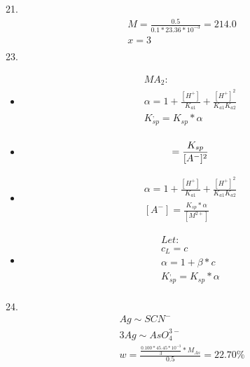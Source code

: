 \documentclass{article}
\begin{document}
21.\begin{equation}
    \begin{multlined}
        M = \frac{0.5}{0.1*23.36*10^{-3}} = 214.0\\
        x = 3\\
    \end{multlined}
\end{equation}
23.\begin{itemize}
    \item 
    \begin{equation}
        \begin{multlined}
            MA_2:\\
            \alpha = 1 + \frac{[H^+]}{K_{a1}} + \frac{[H^+]^2}{K_{a1}K_{a2}}\\
            K^,_{sp} = K_{sp}*\alpha\\
        \end{multlined}
    \end{equation}
    \item
    \begin{equation}
        [M^{2+}] = \frac{K_{sp}}{[A^-]^2}\\
    \end{equation}
    \item
    \begin{equation}
        \begin{multlined}
            \alpha = 1 + \frac{[H^+]}{K_{a1}} + \frac{[H^+]^2}{K_{a1}K_{a2}}\\
            [A^-] = \frac{K_{sp}*\alpha}{[M^{2+}]}
        \end{multlined}
    \end{equation}
    \item
    \begin{equation}
        \begin{multlined}
            Let:\\
            c_L = c\\
            \alpha = 1 + \beta*c\\
            K^,_{sp} = K_{sp}*\alpha\\
        \end{multlined}
    \end{equation}
\end{itemize}
24.\begin{equation}
    \begin{multlined}
    Ag \sim SCN^-\\
    3Ag \sim AsO_4^{3-}\\
        w = \frac{\frac{0.100*45.45*10^{-3}}{3}*M_{As}}{0.5} = 22.70\%\\
    \end{multlined}
\end{equation}
\end{document}
